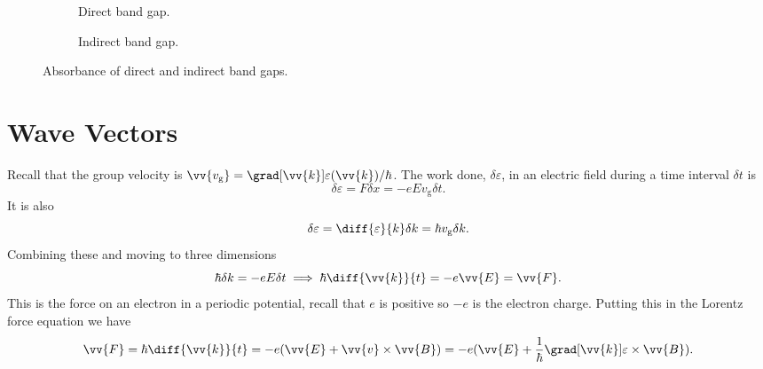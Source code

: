 \documentclass[fleqn]{NotesClass}
\begin{document}
    \begin{figure}
        \begin{subfigure}{0.4\textwidth}
            \centering
            \caption{Direct band gap.}
        \end{subfigure}
        \begin{subfigure}{0.4\textwidth}
            \centering
            \caption{Indirect band gap.}
        \end{subfigure}
        \caption{Absorbance of direct and indirect band gaps.}
        \label{fig:absorbance}
    \end{figure}

    \section{Wave Vectors}
    Recall that the group velocity is \(\vv{v_{\mathrm{g}}} = \grad[\vv{k}]\varepsilon(\vv{k})/\hbar\).
    The work done, \(\delta\varepsilon\), in an electric field during a time interval \(\delta t\) is
    \begin{equation}
        \delta\varepsilon = F\delta x = -eE v_{\mathrm{g}}\delta t.
    \end{equation}
    It is also
    \begin{equation}
        \delta \varepsilon = \diff{\varepsilon}{k}\delta k = \hbar v_{\mathrm{g}}\delta k.
    \end{equation}
    Combining these and moving to three dimensions
    \begin{equation}\label{eqn:hbar dk/dt = F}
        \hbar\delta k = -eE\delta t \implies \hbar\diff{\vv{k}}{t} = -e\vv{E} = \vv{F}.
    \end{equation}
    This is the force on an electron in a periodic potential, recall that \(e\) is positive so \(-e\) is the electron charge.
    Putting this in the Lorentz force equation we have
    \begin{equation}
        \vv{F} = \hbar\diff{\vv{k}}{t} = -e(\vv{E} + \vv{v} \times \vv{B}) = -e(\vv{E} + \frac{1}{\hbar}\grad[\vv{k}]\varepsilon \times\vv{B}).
    \end{equation}
    
\end{document}
